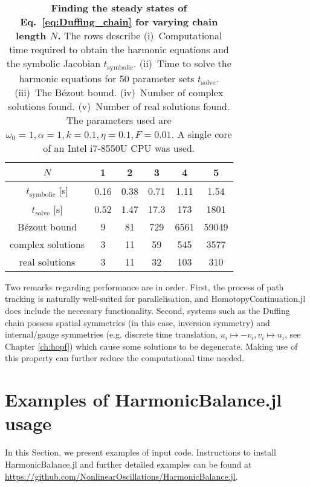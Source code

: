 	\begin{table}[ht!] 
	    \centering
	    \caption{\textbf{Finding the steady states of Eq.~\eqref{eq:Duffing_chain} for varying chain length $N$.} The rows describe (i)~Computational time required to obtain the harmonic equations and the symbolic Jacobian $t_{\mathrm{symbolic}}$. (ii)~Time to solve the harmonic equations for 50 parameter sets $t_{\mathrm{solve}}$. (iii)~The B\'{e}zout bound. (iv)~Number of complex solutions found. (v)~Number of real solutions found. The parameters used are $\omega_0 = 1, \alpha = 1, k=0.1, \eta = 0.1, F=0.01$. A single core of an Intel i7-8550U CPU was used.}
		\label{table:benchmark}
        \begin{tabular}{ |c|c|c|c|c|c|} 
         \hline
         $N$ & 1 & 2 & 3 & 4 & 5 \\ \hline
         $t_{\mathrm{symbolic}}$ [s] & 0.16 & 0.38 & 0.71 & 1.11 & 1.54 \\
         $t_{\mathrm{solve}}$ [s] & 0.52 & 1.47 & 17.3 & 173 & 1801 \\
         B\'{e}zout bound & 9 & 81 & 729 & 6561 & 59049 \\
         complex solutions & 3 & 11 & 59 & 545 & 3577\\
         real solutions & 3 & 11 & 32 & 103 & 310 \\
         \hline
        \end{tabular}

	\end{table}
    
    Two remarks regarding performance are in order. First, the process of path tracking is naturally well-suited for parallelisation, and HomotopyContinuation.jl does include the necessary functionality. Second, systems such as the Duffing chain possess spatial symmetries (in this case, inversion symmetry) and internal/gauge symmetries (e.g. discrete time translation, $u_i\mapsto -v_i, v_i\mapsto u_i$, see Chapter \ref{ch:hopf}) which cause some solutions to be degenerate. Making use of this property can further reduce the computational time needed.
    
\section{Examples of HarmonicBalance.jl usage} \label{sec:examples}
In this Section, we present examples of input code. Instructions to install HarmonicBalance.jl and further detailed examples can be found at \url{https://github.com/NonlinearOscillations/HarmonicBalance.jl}.
